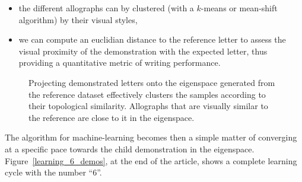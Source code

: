 \documentclass{article}
\begin{document}
\begin{itemize}
    \item the different allographs can by clustered (with a $k$-means or
        mean-shift algorithm) by their visual styles,
    \item we can compute an euclidian distance to the reference letter to assess
        the visual proximity of the demonstration with the expected letter, thus
        providing a quantitative metric of writing performance.
\end{itemize}

\begin{figure}[ht!]
    \centering

    \caption{\small Projecting demonstrated letters onto the eigenspace
    generated from the reference dataset effectively clusters the samples
    according to their topological similarity. Allographs that are visually similar to
    the reference are close to it in the eigenspace.}
    \label{fig:h}
\end{figure}

The algorithm for machine-learning becomes then a simple matter of converging at
a specific pace towards the child demonstration in the eigenspace.
Figure~\ref{learning_6_demos}, at the end of the article, shows a complete learning cycle
with the number ``6''.
\end{document}
